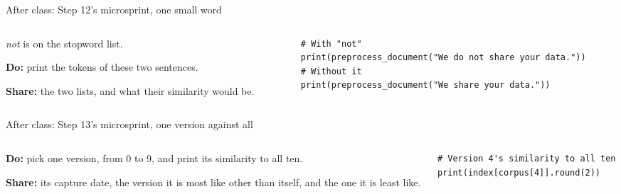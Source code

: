\documentclass[9pt,aspectratio=169]{beamer}
\begin{document}
\begin{frame}[fragile]{After class: Step 12's microsprint, one small word}
    \begin{columns}[T]
        \begin{column}{0.37\textwidth}
            \textit{not} is on the stopword list.

            \medskip
            \textbf{Do:} print the tokens of these two sentences.

            \medskip
            \textbf{Share:} the two lists, and what their similarity would be.
        \end{column}
        \begin{column}{0.6\textwidth}
\begin{lstlisting}
# With "not"
print(preprocess_document("We do not share your data."))
# Without it
print(preprocess_document("We share your data."))
\end{lstlisting}
        \end{column}
    \end{columns}
\end{frame}

\begin{frame}[fragile]{After class: Step 13's microsprint, one version against all}
    \begin{columns}[T]
        \begin{column}{0.37\textwidth}
            \textbf{Do:} pick one version, from 0 to 9, and print its similarity to all ten.

            \medskip
            \textbf{Share:} its capture date, the version it is most like other than itself, and the one it is least like.
        \end{column}
        \begin{column}{0.6\textwidth}
\begin{lstlisting}
# Version 4's similarity to all ten
print(index[corpus[4]].round(2))
\end{lstlisting}
        \end{column}
    \end{columns}
\end{frame}
\end{document}
